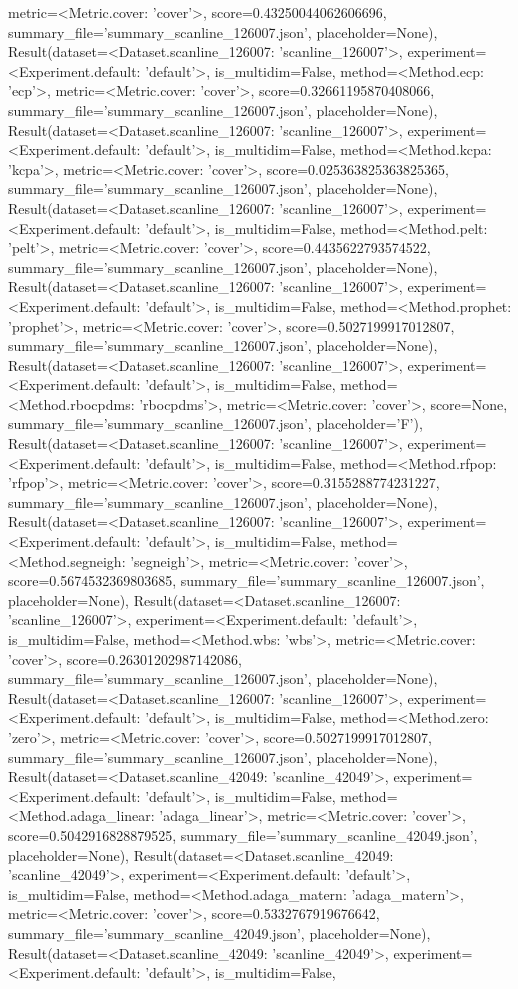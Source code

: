 metric=<Metric.cover: 'cover'>, score=0.43250044062606696, summary_file='summary_scanline_126007.json', placeholder=None), Result(dataset=<Dataset.scanline_126007: 'scanline_126007'>, experiment=<Experiment.default: 'default'>, is_multidim=False, method=<Method.ecp: 'ecp'>, metric=<Metric.cover: 'cover'>, score=0.32661195870408066, summary_file='summary_scanline_126007.json', placeholder=None), Result(dataset=<Dataset.scanline_126007: 'scanline_126007'>, experiment=<Experiment.default: 'default'>, is_multidim=False, method=<Method.kcpa: 'kcpa'>, metric=<Metric.cover: 'cover'>, score=0.025363825363825365, summary_file='summary_scanline_126007.json', placeholder=None), Result(dataset=<Dataset.scanline_126007: 'scanline_126007'>, experiment=<Experiment.default: 'default'>, is_multidim=False, method=<Method.pelt: 'pelt'>, metric=<Metric.cover: 'cover'>, score=0.4435622793574522, summary_file='summary_scanline_126007.json', placeholder=None), Result(dataset=<Dataset.scanline_126007: 'scanline_126007'>, experiment=<Experiment.default: 'default'>, is_multidim=False, method=<Method.prophet: 'prophet'>, metric=<Metric.cover: 'cover'>, score=0.5027199917012807, summary_file='summary_scanline_126007.json', placeholder=None), Result(dataset=<Dataset.scanline_126007: 'scanline_126007'>, experiment=<Experiment.default: 'default'>, is_multidim=False, method=<Method.rbocpdms: 'rbocpdms'>, metric=<Metric.cover: 'cover'>, score=None, summary_file='summary_scanline_126007.json', placeholder='F'), Result(dataset=<Dataset.scanline_126007: 'scanline_126007'>, experiment=<Experiment.default: 'default'>, is_multidim=False, method=<Method.rfpop: 'rfpop'>, metric=<Metric.cover: 'cover'>, score=0.3155288774231227, summary_file='summary_scanline_126007.json', placeholder=None), Result(dataset=<Dataset.scanline_126007: 'scanline_126007'>, experiment=<Experiment.default: 'default'>, is_multidim=False, method=<Method.segneigh: 'segneigh'>, metric=<Metric.cover: 'cover'>, score=0.5674532369803685, summary_file='summary_scanline_126007.json', placeholder=None), Result(dataset=<Dataset.scanline_126007: 'scanline_126007'>, experiment=<Experiment.default: 'default'>, is_multidim=False, method=<Method.wbs: 'wbs'>, metric=<Metric.cover: 'cover'>, score=0.26301202987142086, summary_file='summary_scanline_126007.json', placeholder=None), Result(dataset=<Dataset.scanline_126007: 'scanline_126007'>, experiment=<Experiment.default: 'default'>, is_multidim=False, method=<Method.zero: 'zero'>, metric=<Metric.cover: 'cover'>, score=0.5027199917012807, summary_file='summary_scanline_126007.json', placeholder=None), Result(dataset=<Dataset.scanline_42049: 'scanline_42049'>, experiment=<Experiment.default: 'default'>, is_multidim=False, method=<Method.adaga_linear: 'adaga_linear'>, metric=<Metric.cover: 'cover'>, score=0.5042916828879525, summary_file='summary_scanline_42049.json', placeholder=None), Result(dataset=<Dataset.scanline_42049: 'scanline_42049'>, experiment=<Experiment.default: 'default'>, is_multidim=False, method=<Method.adaga_matern: 'adaga_matern'>, metric=<Metric.cover: 'cover'>, score=0.5332767919676642, summary_file='summary_scanline_42049.json', placeholder=None), Result(dataset=<Dataset.scanline_42049: 'scanline_42049'>, experiment=<Experiment.default: 'default'>, is_multidim=False, 